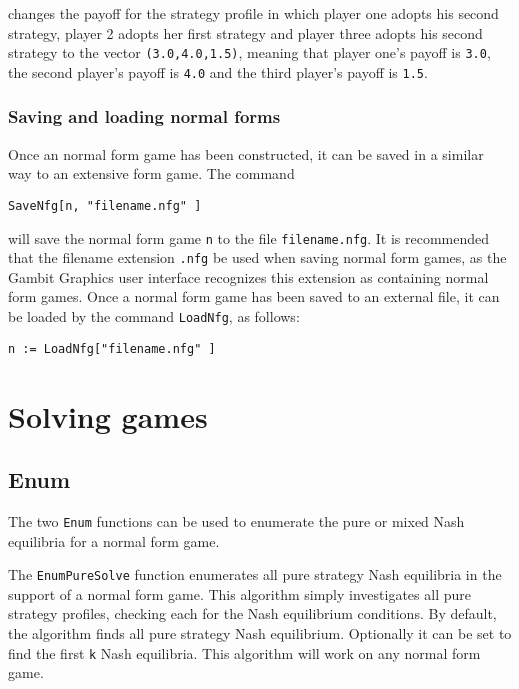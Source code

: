 \noindent
changes the payoff for the strategy profile in which player one adopts
his second strategy, player 2 adopts her first strategy and player
three adopts his second strategy to the vector \verb+(3.0,4.0,1.5)+,
meaning that player one's payoff is \verb+3.0+, the second player's
payoff is \verb+4.0+ and the third player's payoff is \verb+1.5+.

\subsubsection{Saving and loading normal forms}

Once an normal form game has been constructed, it can be saved in a
similar way to an extensive form game.  The command 

\begin{verbatim}
SaveNfg[n, "filename.nfg" ]
\end{verbatim}

\noindent
will save the normal form game \verb+n+ to the file
\verb+filename.nfg+.  It is recommended that the
filename extension \verb+.nfg+ be used when saving normal form games, as
the Gambit Graphics user interface recognizes this extension as
containing normal form games.  Once a normal form game has been
saved to an external file, it can be loaded by the command
\verb+LoadNfg+, as follows:

\begin{verbatim}
n := LoadNfg["filename.nfg" ]
\end{verbatim}

\section{Solving games}

\subsection{Enum}

The two {\tt Enum} functions can be used to enumerate the pure or
mixed Nash equilibria for a normal form game. 

The {\tt EnumPureSolve} function enumerates all pure strategy Nash
equilibria in the support of a normal form game.  This
algorithm simply investigates all pure strategy profiles, checking
each for the Nash equilibrium conditions.  By default, the algorithm
finds all pure strategy Nash equilibrium.  Optionally it can be set to
find the first \verb+k+ Nash equilibria.  This algorithm will work on
any normal form game.  

